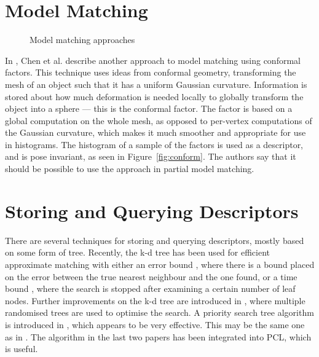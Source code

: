 \documentclass[10pt,a4paper]{article}
\begin{document}
\section{Model Matching}
\begin{figure}
  \centering
  \caption{Model matching approaches}
  \label{fig:modelmatch}
\end{figure}
In \cite{ben2008characterizing}, Chen et al. describe another approach to model
matching using conformal factors. This technique uses ideas from conformal
geometry, transforming the mesh of an object such that it has a uniform Gaussian
curvature. Information is stored about how much deformation is needed locally to
globally transform the object into a sphere --- this is the conformal factor.
The factor is based on a global computation on the whole mesh, as opposed to
per-vertex computations of the Gaussian curvature, which makes it much smoother
and appropriate for use in histograms. The histogram of a sample of the factors
is used as a descriptor, and is pose invariant, as seen in
Figure~\ref{fig:conform}. The authors say that it should be possible to use the
approach in partial model matching.
\section{Storing and Querying Descriptors}
There are several techniques for storing and querying descriptors, mostly based
on some form of tree. Recently, the k-d tree\cite{bentley1975multidimensional,
  friedman1977algorithm} has been used for efficient approximate matching with
either an error bound \cite{arya1998optimal}, where there is a bound placed on
the error between the true nearest neighbour and the one found, or a time bound
\cite{beis1997shape}, where the search is stopped after examining a certain
number of leaf nodes. Further improvements on the k-d tree are introduced in
\cite{silpa2008optimised}, where multiple randomised trees are used to optimise
the search. A priority search tree algorithm is introduced in
\cite{muja2014scalable}, which appears to be very effective. This may be the
same one as in \cite{muja2009fast}. The algorithm in the last two papers has
been integrated into PCL, which is useful.
\end{document}
